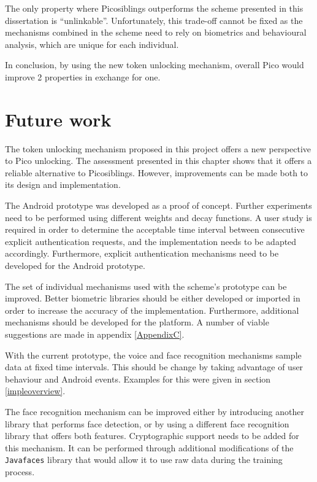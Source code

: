 The only property where Picosiblings outperforms the scheme presented in this dissertation is ``unlinkable''. Unfortunately, this trade-off cannot be fixed	as the mechanisms combined in the scheme need to rely on biometrics and behavioural analysis, which are unique for each individual. 

In conclusion, by using the new token unlocking mechanism, overall Pico would improve 2 properties in exchange for one.

\section{Future work}
The token unlocking mechanism proposed in this project offers a new perspective to Pico unlocking. The assessment presented in this chapter shows that it offers a reliable alternative to Picosiblings. However, improvements can be made both to its design and implementation.

The Android prototype was developed as a proof of concept. Further experiments need to be performed using different weights and decay functions. A user study is required in order to determine the acceptable time interval between consecutive explicit authentication requests, and the implementation needs to be adapted accordingly. Furthermore, explicit authentication mechanisms need to be developed for the Android prototype.

The set of individual mechanisms used with the scheme's prototype can be improved. Better biometric libraries should be either developed or imported in order to increase the accuracy of the implementation. Furthermore, additional mechanisms should be developed for the platform. A number of viable suggestions are made in appendix \ref{AppendixC}.

With the current prototype, the voice and face recognition mechanisms sample data at fixed time intervals. This should be change by taking advantage of user behaviour and Android events. Examples for this were given in section \ref{impleoverview}. 

The face recognition mechanism can be improved either by introducing another library that performs face detection, or by using a different face recognition library that offers both features. Cryptographic support needs to be added for this mechanism.  It can be performed through additional modifications of the {\tt Javafaces} library that would allow it to use raw data during the training process.

